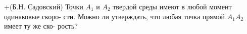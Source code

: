 +(Б.Н. Садовский)
Точки $A_{1}$ и $A_{2}$ твердой среды имеют в любой момент одинаковые скоро-
сти. Можно ли утверждать, что любая точка прямой $A_{1}$$A_{2}$ имеет ту же ско-
рость?
